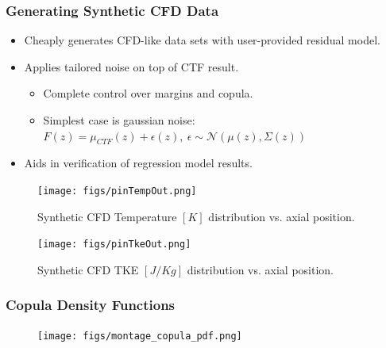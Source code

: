\documentclass[t, pdftex]{beamer}
\begin{document}
\begin{frame}[shrink=20]
\frametitle{Generating Synthetic CFD Data}
\begin{itemize}
\item Cheaply generates CFD-like data sets with user-provided residual model.
\item Applies tailored noise on top of CTF result.
\begin{itemize}
	\item Complete control over margins and copula. 
	\item Simplest case is gaussian noise: $F(z) = \mu_{CTF}(z) + \epsilon(z), \ \epsilon \sim \mathcal N(\mu(z), \Sigma(z))$
\end{itemize}
\item Aids in verification of regression model results. 
\end{itemize}
\begin{figure}
        \centering
        \begin{minipage}{.5\textwidth}
            \centering
            \texttt{[image: figs/pinTempOut.png]}
            \caption{Synthetic CFD Temperature $[K]$ distribution vs. axial position.}
        \end{minipage}%
        \begin{minipage}{.5\textwidth}
            \centering
            \texttt{[image: figs/pinTkeOut.png]}
            \caption{Synthetic CFD TKE  $[J/Kg]$ distribution vs. axial position.}
        \end{minipage}
    \end{figure}
\end{frame}

\begin{frame}
\frametitle{Copula Density Functions}
\vspace{-36pt}
\begin{figure}[!htbp]
\centering
\texttt{[image: figs/montage\_copula\_pdf.png]}
\label{model_overview}
\end{figure}
\end{frame}
\end{document}
